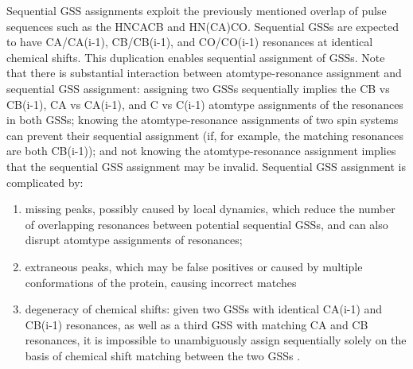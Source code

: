 Sequential GSS assignments exploit the previously mentioned overlap of pulse
sequences such as the HNCACB and HN(CA)CO.  Sequential GSSs 
are expected to have CA/CA(i-1), CB/CB(i-1), and CO/CO(i-1) resonances at 
identical chemical shifts.  This duplication enables sequential assignment 
of GSSs.  Note that there is substantial interaction between atomtype-resonance 
assignment and sequential GSS assignment: assigning two GSSs sequentially 
implies the CB vs CB(i-1), CA vs CA(i-1), and C vs C(i-1) atomtype assignments 
of the resonances in both GSSs; knowing the atomtype-resonance assignments of 
two spin systems can prevent their sequential assignment (if, for example, the 
matching resonances are both CB(i-1)); and not knowing the atomtype-resonance 
assignment implies that the sequential GSS assignment may be invalid.  
Sequential GSS assignment is complicated by: 
\begin{enumerate}
  \item missing peaks, possibly caused 
  by local dynamics, which reduce the number of overlapping resonances between 
  potential sequential GSSs, and can also disrupt atomtype assignments of 
  resonances; 
  \item extraneous peaks, which may be false positives or caused by 
  multiple conformations of the protein, causing incorrect matches
  \item degeneracy of chemical shifts:  given two GSSs with identical CA(i-1) 
  and CB(i-1) resonances, as well as a third GSS with matching CA and CB 
  resonances, it is impossible to unambiguously assign sequentially solely 
  on the basis of chemical shift matching between the two GSSs 
  \cite{autoassign1997}.
\end{enumerate}

